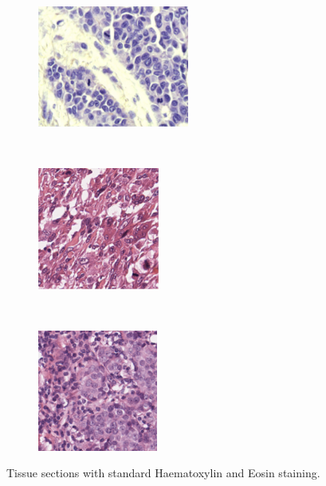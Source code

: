 \documentclass[a4paper,10pt]{article}
\begin{document}
\begin{figure}[!ht]
\centering
\begin{subfigure}{.3\textwidth}
  \centering
  \includegraphics[height=4cm]{histo1.png}
  \caption{}
  \label{fig:sub1}
\end{subfigure}%
~
\begin{subfigure}{.3\textwidth}
  \centering
  \includegraphics[height=4cm]{histo2.png}
  \caption{}
  \label{fig:sub2}
\end{subfigure}
~
\begin{subfigure}{.3\textwidth}
  \centering
  \includegraphics[height=4cm]{histo3.png}
  \caption{}
  \label{fig:sub3}
\end{subfigure}
\caption{Tissue sections with standard Haematoxylin and Eosin staining.}
\label{fig:example_histopath}
\end{figure}
\end{document}
